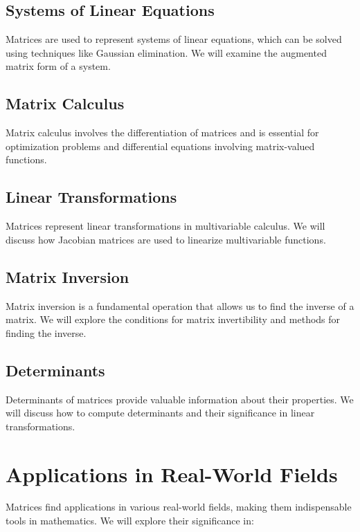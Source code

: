 \documentclass[a4paper,12pt]{book}
\newcounter{problem}
\begin{document}
\subsection{Systems of Linear Equations}

Matrices are used to represent systems of linear equations, which can be solved using techniques like Gaussian elimination. We will examine the augmented matrix form of a system.

\subsection{Matrix Calculus}

Matrix calculus involves the differentiation of matrices and is essential for optimization problems and differential equations involving matrix-valued functions.

\subsection{Linear Transformations}

Matrices represent linear transformations in multivariable calculus. We will discuss how Jacobian matrices are used to linearize multivariable functions.

\subsection{Matrix Inversion}

Matrix inversion is a fundamental operation that allows us to find the inverse of a matrix. We will explore the conditions for matrix invertibility and methods for finding the inverse.

\subsection{Determinants}

Determinants of matrices provide valuable information about their properties. We will discuss how to compute determinants and their significance in linear transformations.

\section{Applications in Real-World Fields}

Matrices find applications in various real-world fields, making them indispensable tools in mathematics. We will explore their significance in:
\end{document}
